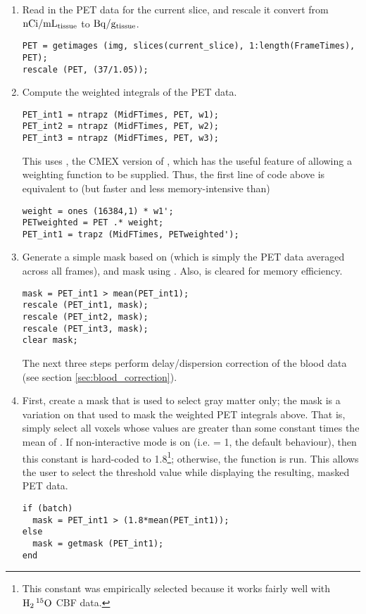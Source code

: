 \begin{enumerate}
\item Read in the PET data for the current slice, and rescale it
  convert from ${\rm nCi/mL_{tissue}}$ to ${\rm Bq/g_{tissue}}$.
  \begin{verbatim}
PET = getimages (img, slices(current_slice), 1:length(FrameTimes), PET);
rescale (PET, (37/1.05));
  \end{verbatim}

\item Compute the weighted integrals of the PET data.
  \begin{verbatim}
PET_int1 = ntrapz (MidFTimes, PET, w1);
PET_int2 = ntrapz (MidFTimes, PET, w2);
PET_int3 = ntrapz (MidFTimes, PET, w3);
  \end{verbatim}

  This uses , the CMEX version of , which has
  the useful feature of allowing a weighting function to be supplied.
  Thus, the first line of code above is equivalent to (but faster and
  less memory-intensive than)
  \begin{verbatim}
weight = ones (16384,1) * w1';
PETweighted = PET .* weight;
PET_int1 = trapz (MidFTimes, PETweighted');
  \end{verbatim}

\item Generate a simple mask based on  (which is
  simply the PET data averaged across all frames), and mask using
  .  Also,  is cleared for memory efficiency.
  \begin{verbatim}
mask = PET_int1 > mean(PET_int1);
rescale (PET_int1, mask);
rescale (PET_int2, mask);
rescale (PET_int3, mask);
clear mask;
  \end{verbatim}

  The next three steps perform delay/dispersion correction of the
  blood data (see section \ref{sec:blood_correction}).  


\item First, create a mask that is used to select gray matter only;
  the mask is a variation on that used to mask the weighted PET
  integrals above.  That is, simply select all voxels whose values are
  greater than some constant times the mean of .  If
  non-interactive mode is on (i.e.   = 1, the default
  behaviour), then this constant is hard-coded to 1.8\footnote{This
    constant was empirically selected because it works fairly well
    with ${\rm H_{2}\,^{15}O}$ CBF data.}; otherwise, the function
   is run.  This allows the user to select the threshold
  value while displaying the resulting, masked PET data.
  \begin{verbatim}
if (batch)
  mask = PET_int1 > (1.8*mean(PET_int1));
else
  mask = getmask (PET_int1);
end
  \end{verbatim}


\end{enumerate}
